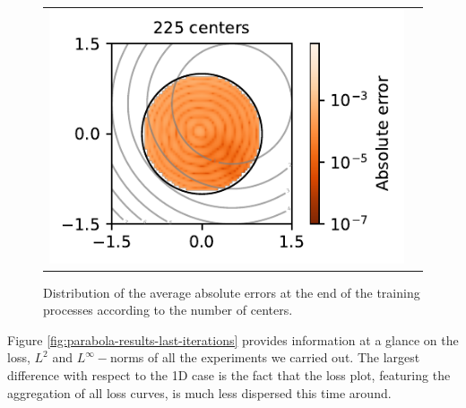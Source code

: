 \documentclass[12pt]{report} %
\begin{document}
\begin{figure}
\begin{tabular}{ccl}
    \multicolumn{2}{l}{\includegraphics[width=.4\textwidth, clip=true,trim={0 0 2.1cm 0}]{imagenes/experiments/2d/statistical_2d_full_scheduler_interpolation/parabola/parabola_225.pdf}} &
  \end{tabular}
  \caption{Distribution of the average absolute errors at the end of the training processes according to the number of centers.}
  \label{fig:parabola-results-largest-errors}
\end{figure}


Figure \ref{fig:parabola-results-last-iterations} provides information at a glance on the loss, $L^2$ and $L^\infty-$norms of all the experiments we carried out. The largest difference with respect to the 1D case is the fact that the loss plot, featuring the aggregation of all loss curves, is much less dispersed this time around. %
\end{document}
